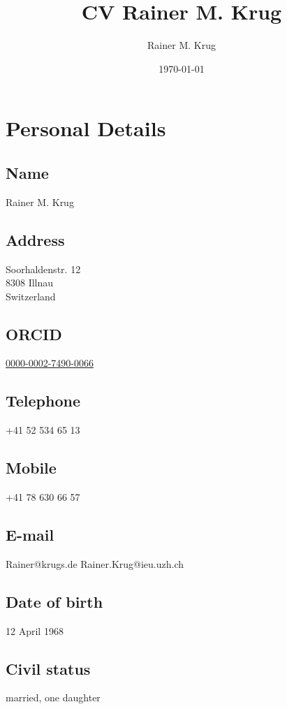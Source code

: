 \documentclass[a4paper]{article}
\author{Rainer M. Krug}
\date{\today}
\title{CV Rainer M. Krug}
\begin{document}
\maketitle


\section{Personal Details}

\subsection{Name}

Rainer M. Krug
\subsection{Address}

Soorhaldenstr. 12 \\
8308 Illnau \\
Switzerland

\subsection{ORCID}
\href{https://orcid.org/0000-0002-7490-0066}{0000-0002-7490-0066}

\subsection{Telephone}

+41 52 534 65 13
\subsection{Mobile}

+41 78 630 66 57
\subsection{E-mail}

Rainer@krugs.de
Rainer.Krug@ieu.uzh.ch
\subsection{Date of birth}

12 April 1968
\subsection{Civil status}

married, one daughter
\end{document}
